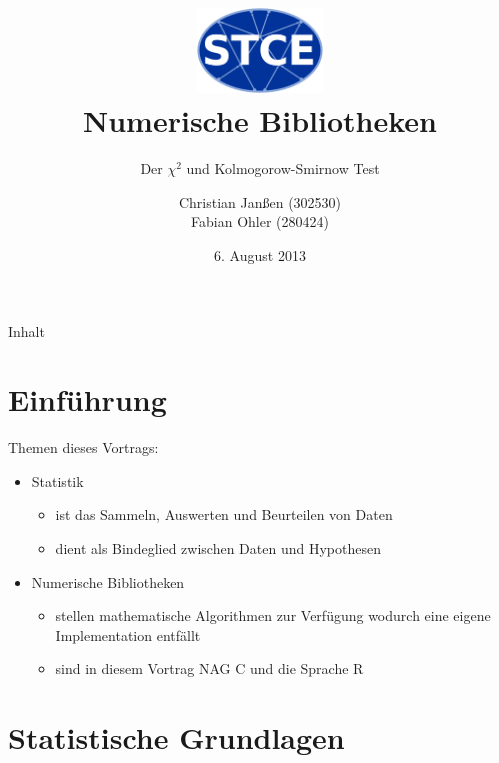 \documentclass{beamer}
\begin{document}
\title{\centering
\includegraphics[width=0.25\textwidth]{./figures/logo.eps} \\ Numerische Bibliotheken}

\subtitle{Der $\chi^2$ und Kolmogorow-Smirnow Test}
\author{Christian Janßen (302530) \\ Fabian Ohler (280424) }
\date{6. August 2013}
\frame[plain]{\titlepage}

\begin{frame}{Inhalt}
	\tableofcontents
\end{frame}

\section{Einführung}
\begin{frame}{\insertsection}
Themen dieses Vortrags:
	\begin{itemize}
		\item Statistik
			\begin{itemize}
			\item ist das Sammeln, Auswerten und Beurteilen von Daten
			\item dient als Bindeglied zwischen Daten und Hypothesen
			\end{itemize}		
		\item Numerische Bibliotheken
			\begin{itemize}
			\item stellen mathematische Algorithmen zur Verfügung wodurch eine eigene Implementation entfällt
			\item sind in diesem Vortrag NAG C und die Sprache R
			\end{itemize}
	\end{itemize}
\end{frame}

\section{Statistische Grundlagen}
\end{document}
